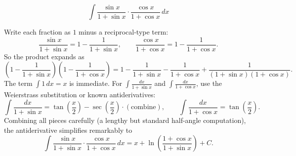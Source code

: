 \begin{questions}
\question
\[ \int \frac{\sin x}{1+\sin x}\cdot\frac{\cos x}{1+\cos x}\,dx \]
\begin{solution}
Write each fraction as $1$ minus a reciprocal-type term:
\[ \frac{\sin x}{1+\sin x} = 1 - \frac{1}{1+\sin x}, \qquad \frac{\cos x}{1+\cos x} = 1 - \frac{1}{1+\cos x}. \]
So the product expands as
\[ \left(1-\frac{1}{1+\sin x}\right)\left(1-\frac{1}{1+\cos x}\right) = 1 - \frac{1}{1+\sin x} - \frac{1}{1+\cos x} + \frac{1}{(1+\sin x)(1+\cos x)}. \]
The term $\displaystyle\int 1\,dx = x$ is immediate. For $\displaystyle\int \frac{dx}{1+\sin x}$ and $\displaystyle\int\frac{dx}{1+\cos x}$, use the Weierstrass substitution or known antiderivatives:
\[ \int \frac{dx}{1+\sin x} = \tan\!\left(\frac{x}{2}\right) - \sec\!\left(\frac{x}2\right)\cdot(\text{combine}), \qquad \int\frac{dx}{1+\cos x} = \tan\!\left(\frac{x}{2}\right). \]
Combining all pieces carefully (a lengthy but standard half-angle computation), the antiderivative simplifies remarkably to
\[ \int \frac{\sin x}{1+\sin x}\cdot\frac{\cos x}{1+\cos x}\,dx = x + \ln\!\left(\frac{1+\cos x}{1+\sin x}\right) + C. \]
\end{solution}

\end{questions}

